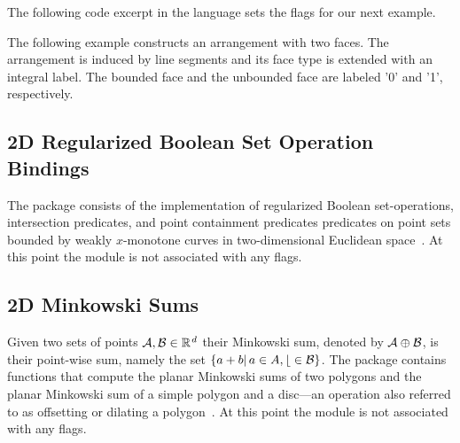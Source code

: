 The following code excerpt in the \cmake{} language sets the \cmake{} flags for our next example.

The following example constructs an arrangement with two faces. The
arrangement is induced by line segments and its face type is extended
with an integral label. The bounded face and the unbounded face are labeled
'0' and '1', respectively.

\subsection{2D Regularized Boolean Set Operation Bindings}
\label{ssec:modules:bso2}
The \cgal{} package \iiDRegularizedBooleanSetOperationsPackage{}
consists of the implementation of regularized Boolean set-operations,
intersection predicates, and point containment predicates predicates
on point sets bounded by weakly $x$-monotone curves in two-dimensional
Euclidean space~\cite{cgal:fwzh-rbso2-21a}. At this point the
\iiDRegularizedBooleanSetOperationsPackage{} module is not associated
with any \cmake{} flags.

\subsection{2D Minkowski Sums}
\label{ssec:modules:ms2}
Given two sets of points $\calA, \calB \in \Rd$ their Minkowski sum,
denoted by ${\cal A} \oplus {\cal B}$, is their point-wise sum, namely the
set $\{a+b |\, a \in A\cal,b \in {\cal B}\}$. The \cgal{} package
\iiDMinkowskiSumsPackage{} contains functions that compute the planar
Minkowski sums of two polygons and the planar Minkowski sum of a
simple polygon and a disc---an operation also referred to as
offsetting or dilating a polygon~\cite{cgal:w-rms2-21a}. At this point
the \iiDMinkowskiSumsPackage{} module is not associated with any
\cmake{} flags.

